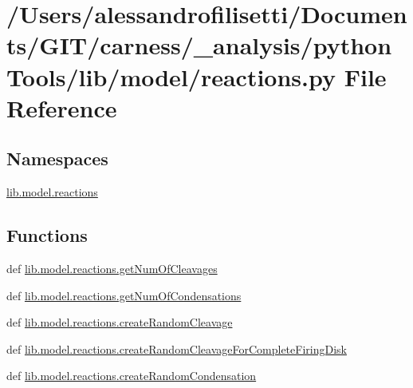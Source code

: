 \hypertarget{a00095}{\section{/\+Users/alessandrofilisetti/\+Documents/\+G\+I\+T/carness/\+\_\+analysis/python\+Tools/lib/model/reactions.py File Reference}
\label{a00095}
}
\subsection*{Namespaces}
\begin{DoxyCompactItemize}
\item 
 \hyperlink{a00149}{lib.\+model.\+reactions}
\end{DoxyCompactItemize}
\subsection*{Functions}
\begin{DoxyCompactItemize}
\item 
def \hyperlink{a00149_a39866224c062e8fdc5905a4202d9e579}{lib.\+model.\+reactions.\+get\+Num\+Of\+Cleavages}
\item 
def \hyperlink{a00149_a8385f261f5039a8cfeefa089298872f3}{lib.\+model.\+reactions.\+get\+Num\+Of\+Condensations}
\item 
def \hyperlink{a00149_a2e361527fbcbb7ae4b02783df35d33ff}{lib.\+model.\+reactions.\+create\+Random\+Cleavage}
\item 
def \hyperlink{a00149_a5eb802389e0de8e036b9a38dfeb41c70}{lib.\+model.\+reactions.\+create\+Random\+Cleavage\+For\+Complete\+Firing\+Disk}
\item 
def \hyperlink{a00149_abc3efdd6ab0936972017dc010317bd3d}{lib.\+model.\+reactions.\+create\+Random\+Condensation}
\end{DoxyCompactItemize}
